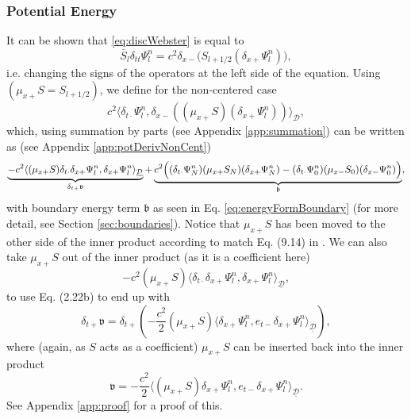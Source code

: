 \documentclass[dvipsnames]{article}
\def\dxp{\delta_{x+}}
\def\dxm{\delta_{x-}}
\def\mup{\mu_{x+}}
\def\mum{\mu_{x-}}
\def\Sp{S_{l+1/2}}
\def\Psiln{\Psi_l^n}
\def\Sbar{\bar S_l}
\def\dtd{\delta_{t\cdot}}
\begin{document}
\subsubsection{Potential Energy}
It can be shown that \eqref{eq:discWebster} is equal to
\begin{equation}
    \Sbar \delta_{tt}\Psi^n_l = c^2\dxm\big(\Sp(\dxp\Psiln)\big),
\end{equation}
i.e. changing the signs of the operators at the left side of the equation. Using $(\mup S = S_{l+1/2})$, we define for the non-centered case
\begin{equation}\label{eq:potContEnergy}
c^2\langle \dtd\Psiln, \dxm((\mup S)(\dxp\Psiln))\rangle_\mathcal{D},
\end{equation}
which, using summation by parts (see Appendix \ref{app:summation}) can be written as (see Appendix \ref{app:potDerivNonCent})
\begin{equation}\label{eq:discROCPotBoundNonCent}
\underbrace{-c^2\langle(\mu_{x+}S)\dtd\dxp\Psiln, \dxp\Psiln\rangle_{\underline{\mathcal{D}}}}_{\let\scriptstyle\textstyle\delta_{t+}\mathfrak{v}} + \underbrace{c^2\Big( (\dtd\Psi_N^n)(\mup S_N)(\dxp\Psi_N^n) -(\dtd\Psi_0^n)(\mum S_0)(\dxm \Psi_0^n)\Big)}_{\mathfrak{b}},
\end{equation}
with boundary energy term $\mathfrak{b}$ as seen in Eq. \eqref{eq:energyFormBoundary} (for more detail, see Section \ref{sec:boundaries}).
Notice that $\mup S$ has been moved to the other side of the inner product according to match Eq. (9.14) in \cite{Bilbao2009}. We can also take $\mup S$ out of the inner product (as it is a coefficient here)
\begin{equation}
    -c^2(\mu_{x+}S)\langle\dtd\dxp\Psiln, \dxp\Psiln\rangle_{\underline{\mathcal{D}}},
\end{equation}
to use Eq. (2.22b) to end up with 
\begin{equation}
    \delta_{t+}\mathfrak{v} = \delta_{t+}\left(-\frac{c^2}{2}(\mu_{x+}S)\langle\dxp\Psiln, e_{t-}\dxp\Psiln\rangle_{\underline{\mathcal{D}}}\right),
\end{equation}
where (again, as $S$ acts as a coefficient) $\mup S$ can be inserted back into the inner product
\begin{equation}
   \mathfrak{v}=-\frac{c^2}{2}\langle(\mu_{x+}S)\dxp\Psiln, e_{t-}\dxp\Psiln\rangle_{\underline{\mathcal{D}}}.
\end{equation}
See Appendix \ref{app:proof} for a proof of this.
\end{document}
